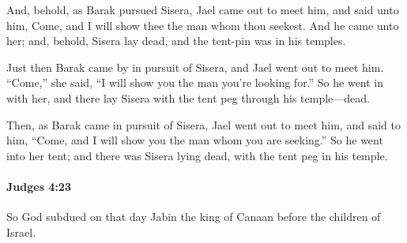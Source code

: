 			\begin{versebox}
					\item[BHS] 
					\item[ASV] And, behold, as Barak pursued Sisera, Jael came out to meet him, and said unto him, Come, and I will show thee the man whom thou seekest. And he came unto her; and, behold, Sisera lay dead, and the tent-pin was in his temples.
					\item[NIV] Just then Barak came by in pursuit of Sisera, and Jael went out to meet him. “Come,” she said, “I will show you the man you’re looking for.” So he went in with her, and there lay Sisera with the tent peg through his temple—dead.
					\item[NRSV] Then, as Barak came in pursuit of Sisera, Jael went out to meet him, and said to him, “Come, and I will show you the man whom you are seeking.” So he went into her tent; and there was Sisera lying dead, with the tent peg in his temple.
			\end{versebox}

		\paragraph{Judges 4:23} %
			\label{JUDGES-4-23}

			So God subdued on that day Jabin the king of Canaan before the children of Israel.

